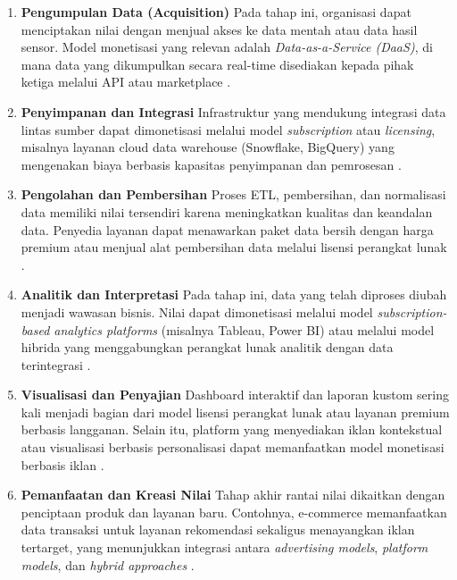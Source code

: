 \begin{enumerate}
	\item \textbf{Pengumpulan Data (Acquisition)}  
	Pada tahap ini, organisasi dapat menciptakan nilai dengan menjual akses ke data mentah atau data hasil sensor. Model monetisasi yang relevan adalah \textit{Data-as-a-Service (DaaS)}, di mana data yang dikumpulkan secara real-time disediakan kepada pihak ketiga melalui API atau marketplace \cite{gorton2020monetising}. 
	
	\item \textbf{Penyimpanan dan Integrasi}  
	Infrastruktur yang mendukung integrasi data lintas sumber dapat dimonetisasi melalui model \textit{subscription} atau \textit{licensing}, misalnya layanan cloud data warehouse (Snowflake, BigQuery) yang mengenakan biaya berbasis kapasitas penyimpanan dan pemrosesan \cite{armbrust2021lakehouse}. 
	
	\item \textbf{Pengolahan dan Pembersihan}  
	Proses ETL, pembersihan, dan normalisasi data memiliki nilai tersendiri karena meningkatkan kualitas dan keandalan data. Penyedia layanan dapat menawarkan paket data bersih dengan harga premium atau menjual alat pembersihan data melalui lisensi perangkat lunak \cite{rahm2000dataquality}. 
	
	\item \textbf{Analitik dan Interpretasi}  
	Pada tahap ini, data yang telah diproses diubah menjadi wawasan bisnis. Nilai dapat dimonetisasi melalui model \textit{subscription-based analytics platforms} (misalnya Tableau, Power BI) atau melalui model hibrida yang menggabungkan perangkat lunak analitik dengan data terintegrasi \cite{provost2013datascience}. 
	
	\item \textbf{Visualisasi dan Penyajian}  
	Dashboard interaktif dan laporan kustom sering kali menjadi bagian dari model lisensi perangkat lunak atau layanan premium berbasis langganan. Selain itu, platform yang menyediakan iklan kontekstual atau visualisasi berbasis personalisasi dapat memanfaatkan model monetisasi berbasis iklan \cite{few2006dashboard}. 
	
	\item \textbf{Pemanfaatan dan Kreasi Nilai}  
	Tahap akhir rantai nilai dikaitkan dengan penciptaan produk dan layanan baru. Contohnya, e-commerce memanfaatkan data transaksi untuk layanan rekomendasi sekaligus menayangkan iklan tertarget, yang menunjukkan integrasi antara \textit{advertising models}, \textit{platform models}, dan \textit{hybrid approaches} \cite{labreuche2020, hartmann2016data}. 
\end{enumerate}

